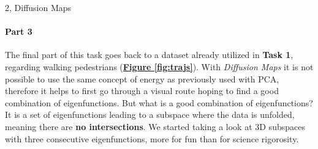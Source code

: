 \documentclass[10pt,a4paper]{article}
\begin{document}
\begin{task}{2, Diffusion Maps}
\paragraph{Part 3}
The final part of this task goes back to a dataset already utilized in \textbf{Task 1}, regarding walking pedestrians (\textbf{\hyperref[fig:trajs]{Figure \ref{fig:trajs}}}). With \textit{Diffusion Maps} it is not possible to use the same concept of energy as previously used with PCA, therefore it helps to first go through a visual route hoping to find a good combination of eigenfunctions. But what is a good combination of eigenfunctions? It is a set of eigenfunctions leading to a subspace where the data is unfolded, meaning there are \textbf{no intersections}. We started taking a look at 3D subspaces with three consecutive eigenfunctions, more for fun than for science rigorosity. 


\end{task}
\end{document}
